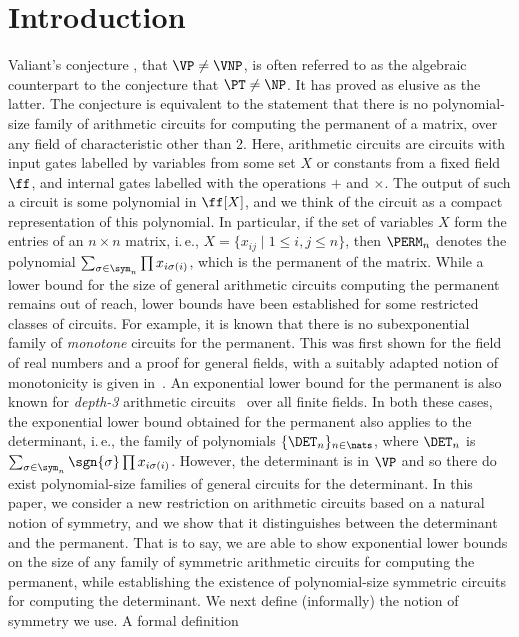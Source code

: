 \documentclass[11pt]{article}
\newcommand{\ie}{i.\,e.}
\begin{document}
\section{Introduction}\label{sec:introduction}
Valiant's conjecture \cite{Valiant79}, that $\VP\neq\VNP$, is often referred to
as the algebraic counterpart to the conjecture that $\PT\neq\NP$. It has proved
as elusive as the latter. The conjecture is equivalent to the statement that
there is no polynomial-size family of arithmetic circuits for computing the
permanent of a matrix, over any field of characteristic other than 2. Here,
arithmetic circuits are circuits with input gates labelled by variables from
some set $X$ or constants from a fixed field $\ff$, and internal gates labelled
with the operations $+$ and $\times$. The output of such a circuit is some
polynomial in $\ff[X]$, and we think of the circuit as a compact representation
of this polynomial. In particular, if the set of variables $X$ form the entries
of an $n\times n$ matrix, \ie, $X = \{x_{ij} \mid 1\leq i,j \leq n\}$, then
$\PERM_n$ denotes the polynomial $\sum_{\sigma \in \sym_n}\prod x_{i\sigma(i)}$,
which is the permanent of the matrix.
While a lower bound for the size of general arithmetic circuits computing the
permanent remains out of reach, lower bounds have been established for some
restricted classes of circuits. For example, it is known that there is no
subexponential family of \emph{monotone} circuits for the permanent. This was
first shown for the field of real numbers \cite{JerrumS82} and a proof for
general fields, with a suitably adapted notion of monotonicity is given
in~\cite{KayalS14}. An exponential lower bound for the permanent is also known
for \emph{depth-3} arithmetic circuits~\cite{GK98} over all finite fields. In
both these cases, the exponential lower bound obtained for the permanent also
applies to the determinant, \ie, the family of polynomials $\{\DET_n\}_{n \in
  \nats}$, where $\DET_n$ is $\sum_{\sigma \in \sym_n} \sgn{\sigma}\prod
x_{i\sigma(i)}$. However, the determinant is in $\VP$ and so there do exist
polynomial-size families of general circuits for the determinant.
In this paper, we consider a new restriction on arithmetic circuits based on a
natural notion of symmetry, and we show that it distinguishes between the
determinant and the permanent. That is to say, we are able to show exponential
lower bounds on the size of any family of symmetric arithmetic circuits for
computing the permanent, while establishing the existence of polynomial-size
symmetric circuits for computing the determinant.
We next define (informally) the notion of symmetry we use. A formal definition
\end{document}
